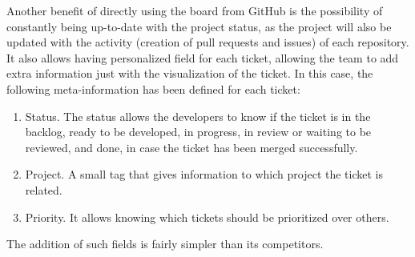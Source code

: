 \documentclass[../memory.tex]{subfiles}
\begin{document}
Another benefit of directly using the board from GitHub is the possibility of
constantly being up-to-date with the project status, as the project will also be
updated with the activity (creation of pull requests and issues) of each
repository.
\\
It also allows having personalized field for each ticket, allowing the team to
add extra information just with the visualization of the ticket. In this case,
the following meta-information has been defined for each ticket:
\begin{enumerate}[label = -]
	\item Status. The status allows the developers to know if the ticket is in the
	      backlog, ready to be developed, in progress, in review or waiting to be
	      reviewed, and done, in case the ticket has been merged successfully.
	\item Project. A small tag that gives information to which project the ticket
	      is related.
	\item Priority. It allows knowing which tickets should be prioritized over
	      others.
\end{enumerate}
The addition of such fields is fairly simpler than its competitors.
\end{document}
